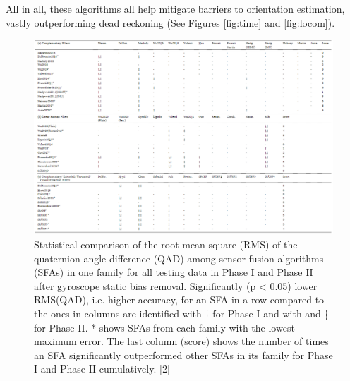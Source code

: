 \documentclass[10pt]{report}
\begin{document}
All in all, these algorithms all help mitigate barriers to orientation estimation, vastly outperforming dead reckoning (See Figures \ref{fig:time} and \ref{fig:locom}).
\newpage
\begin{figure}[!h]
  \caption{ Statistical comparison of the root-mean-square (RMS) of the quaternion angle difference (QAD) among sensor fusion algorithms (SFAs) in one family for all testing data in Phase I and Phase II after gyroscope static bias removal. Significantly (p < 0.05) lower RMS(QAD), i.e. higher accuracy, for an SFA in a row compared to the ones in columns are identified with † for Phase I and with and ‡ for Phase II. * shows SFAs from each family with the lowest maximum error. The last column (score) shows the number of times an SFA significantly outperformed other SFAs in its family for Phase I and Phase II cumulatively. [2]}
  \centering
  \label{fig:fullcomp}
  \includegraphics[width=1.2\textwidth]{full_comp.PNG}
\end{figure}
\end{document}
